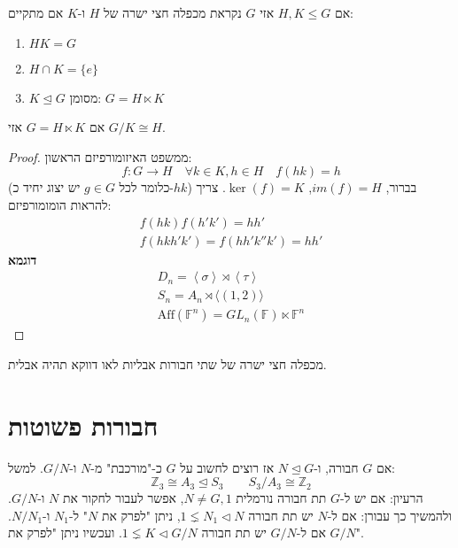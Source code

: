 \documentclass{tstextbook}
\begin{document}
\begin{definition}
אם \(H,K\leq G\) אזי \(G\) נקראת מכפלה חצי ישרה של \(H\) ו-\(K\) אם מתקיים:

  \begin{enumerate}
    \item \(HK=G\)


    \item \(H\cap K=\{ e \}\)


    \item \(K\trianglelefteq G\) 
מסומן: \(G=H\ltimes K\)


  \end{enumerate}
\end{definition}
\begin{proposition}
אם \(G=H\ltimes K\) אזי \(G / K \cong H\).

\end{proposition}
\begin{proof}
ממשפט האיזומורפיזם הראשון:
$$f:G\to H \quad \forall k\in K, h\in H\quad f(hk)=h$$
(כלומר לכל \(g\in G\) יש יצוג יחיד כ-\(hk\)) בברור, \(im(f)=H\), \(\ker(f)=K\). צריך להראות הומומורפיזם: 
$$\begin{gathered}f(hk)f(h'k')=hh'\\f(hkh'k')=f(hh'k''k')=hh'
\end{gathered}$$\textbf{דוגמא}$$\begin{gathered}D_{n}=\left\langle  \sigma \right\rangle\rtimes \left\langle  \tau \right\rangle \\S_{n}=A_{n} \rtimes \langle (1,2)\rangle\\\mathrm{Aff}\left( \mathbb{F}^n  \right)=GL_{n}\left( \mathbb{F} \right)\ltimes \mathbb{F}^n
\end{gathered}$$

\end{proof}
\begin{remark}
מכפלה חצי ישרה של שתי חבורות אבליות לאו דווקא תהיה אבלית.

\end{remark}
\section{חבורות פשוטות}

אם \(G\) חבורה, ו-\(N\trianglelefteq G\) אז רוצים לחשוב על \(G\) כ-"מורכבת" מ-\(N\) ו-\(G/N\). למשל:
$$\mathbb{Z} _{3} \cong A_{3}\trianglelefteq S_{3}\qquad S_{3} / A_{3} \cong \mathbb{Z} _{2}$$
הרעיון:
אם יש ל-\(G\) תת חבורה נורמלית \(N\neq G,1\), אפשר לעבור לחקור את \(N\) ו-\(G / N\). ולהמשיך כך עבורן: אם ל-\(N\) יש תת חבורה \(1\lneq N_{1}\triangleleft N\), ניתן "לפרק את \(N\)" ל-\(N_{1}\) ו-\(N / N_{1}\). אם ל-\(G / N\) יש תת חבורה \(1\lneq K \triangleleft G / N\). ועכשיו ניתן "לפרק את \(G / N\)".
\end{document}

